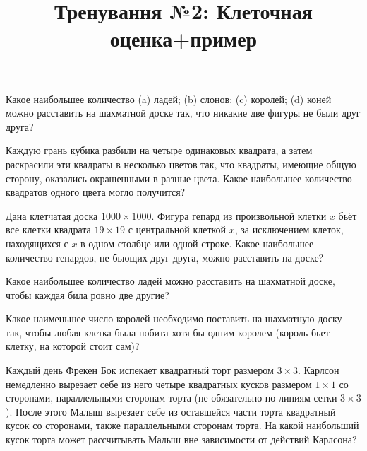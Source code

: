


\title{Тренування №2: Клеточная оценка+пример}
\maketitle
\begin{problem}
	Какое наибольшее количество (a) ладей; (b) слонов; (c) королей; (d) коней можно расставить на шахматной доске так, что никакие две фигуры не были друг друга?
\end{problem}

\begin{problem}
	Каждую грань кубика разбили на четыре одинаковых квадрата, а затем раскрасили эти квадраты в несколько цветов так, что квадраты, имеющие общую сторону, оказались окрашенными в разные цвета. Какое наибольшее количество квадратов одного цвета могло получится?
\end{problem}

\begin{problem}
	Дана клетчатая доска $1000 \times 1000$. Фигура гепард из произвольной клетки $x$ бьёт все клетки квадрата $19 \times 19$ с центральной клеткой $x$, за исключением клеток, находящихся с $x$ в одном столбце или одной строке. Какое наибольшее количество гепардов, не бьющих друг друга, можно расставить на доске?
\end{problem}

\begin{problem}
	Какое наибольшее количество ладей можно расставить на шахматной доске, чтобы каждая била ровно две другие?
\end{problem}

\begin{problem}
	Какое наименьшее число королей необходимо поставить на шахматную доску так, чтобы любая клетка была побита хотя бы одним королем (король бьет клетку, на которой стоит сам)?
\end{problem}

\begin{problem}
	Каждый день Фрекен Бок испекает квадратный торт размером $3 \times 3$. Карлсон немедленно вырезает себе из него четыре квадратных кусков размером $1 \times 1$ со сторонами, параллельными сторонам торта (не обязательно по линиям сетки $3 \times 3$). После этого Малыш вырезает себе из оставшейся части торта квадратный кусок со сторонами, также параллельными сторонам торта. На какой наибольший кусок торта может рассчитывать Малыш вне зависимости от действий Карлсона?
\end{problem}


